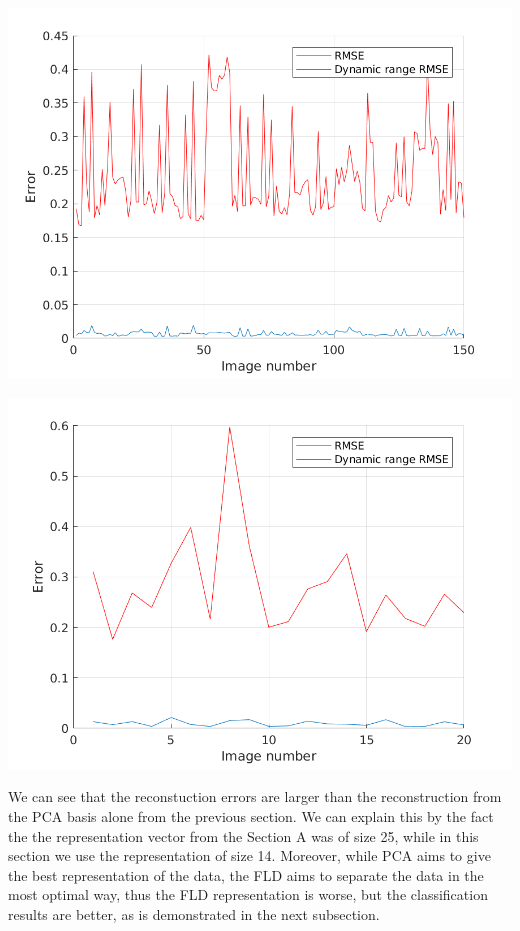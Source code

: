 \documentclass[a4paper]{iacas}
\begin{document}
\vskip 0.1in
\begin{minipage}{\linewidth}
	\centering
	\includegraphics[scale=0.9]{imgs2/rmse_train.png}
	\label{fig_1}
\end{minipage}
\vskip 0.1in
\begin{minipage}{\linewidth}
	\centering
	\includegraphics[scale=0.9]{imgs2/rmse_test.png}
	\label{fig_1}
\end{minipage}
\vskip 0.1in

We can see that the reconstuction errors are larger than the reconstruction from the PCA basis alone from the previous section. We can explain this by the fact the the representation vector from the Section A was of size 25, while in this section we use the representation of size 14. Moreover, while PCA aims to give the best representation of the data, the FLD aims to separate the data in the most optimal way, thus the FLD representation is worse, but the classification results are better, as is demonstrated in the next subsection.
\end{document}
